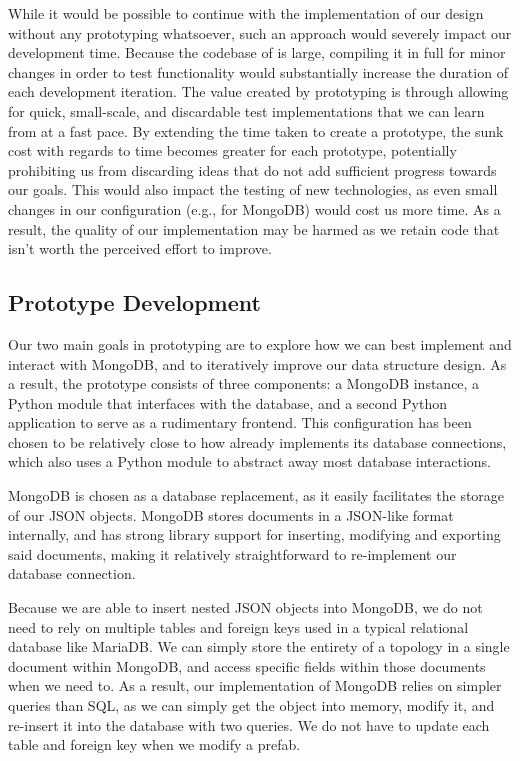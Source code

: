 \documentclass[11pt]{article}
\begin{document}
		While it would be possible to continue with the implementation of our design without any prototyping whatsoever, such an approach would severely impact our development time.
		Because the codebase of \opendc{} is large, compiling it in full for minor changes in order to test functionality would substantially increase the duration of each development iteration.
		The value created by prototyping is through allowing for quick, small-scale, and discardable test implementations that we can learn from at a fast pace.
		By extending the time taken to create a prototype, the sunk cost with regards to time becomes greater for each prototype, potentially prohibiting us from discarding ideas that do not add sufficient progress towards our goals.
		This would also impact the testing of new technologies, as even small changes in our configuration (e.g., for MongoDB) would cost us more time.
		As a result, the quality of our implementation may be harmed as we retain code that isn't worth the perceived effort to improve.
	
	\subsection{Prototype Development}
		Our two main goals in prototyping are to explore how we can best implement and interact with MongoDB, and to iteratively improve our data structure design.
		As a result, the prototype consists of three components: a MongoDB instance, a Python module that interfaces with the database, and a second Python application to serve as a rudimentary frontend. 
		This configuration has been chosen to be relatively close to how \opendc{} already implements its database connections, which also uses a Python module to abstract away most database interactions.

		MongoDB is chosen as a database replacement, as it easily facilitates the storage of our JSON objects.
		MongoDB stores documents in a JSON-like format internally, and has strong library support for inserting, modifying and exporting said documents, making it relatively straightforward to re-implement our database connection.

		Because we are able to insert nested JSON objects into MongoDB, we do not need to rely on multiple tables and foreign keys used in a typical relational database like MariaDB.
		We can simply store the entirety of a topology in a single document within MongoDB, and access specific fields within those documents when we need to.
		As a result, our implementation of MongoDB relies on simpler queries than SQL, as we can simply get the object into memory, modify it, and re-insert it into the database with two queries.
		We do not have to update each table and foreign key when we modify a prefab.
\end{document}
